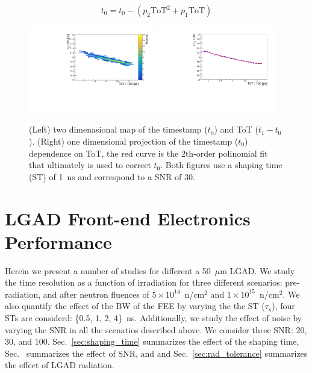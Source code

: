 \documentclass[preprint,1p]{elsarticle}
\begin{document}
\begin{equation}\label{eq:time_walk}
  t_{0} = t_{0}-(p_{2}\mathrm{ToT}^2+p_{1}\mathrm{ToT})
\end{equation}

\begin{figure}[htbp]
  \centering
  \includegraphics[width=0.48\textwidth]{figs/twoD_ToT_pre_rad_st_1ns_snr_30_le_tot_threshold_30mV_v2.pdf} \hfill
  \includegraphics[width=0.48\textwidth]{figs/oneD_ToT_pre_rad_st_1ns_snr_30_le_tot_threshold_30mV_v2.pdf}
  \caption{(Left) two dimenasional map of the timestamp ($t_{0}$) and ToT ($t_{1} - t_{0}$).
  (Right) one dimensional projection of the timestamp ($t_{0}$) dependence on ToT, the red curve is the 2th-order polinomial fit that
  ultimately is used to correct $t_{0}$. Both figures use a shaping time (ST) of 1~\si{ns} and correspond to a SNR of 30.}
  \label{fig:ToT}
\end{figure}




\section{LGAD Front-end Electronics Performance}\label{sec:results}

Herein we present a number of studies for different a 50~$\mu$m LGAD. We study the time resolution as a function of irradiation
for three different scenarios: pre-radiation, and after neutron fluences of
 $5\times 10^{14}$~n/cm$^2$ and $1\times 10^{15}$~n/cm$^2$. We also quantify the effect of the BW of the FEE by varying the
 the ST ($\tau_{s}$), four STs are considerd: \{0.5, 1, 2, 4\}~\si{ns}. Additionally, we study the effect of noise by varying
 the SNR in all the scenatios described above. We consider three SNR: 20, 30, and 100.
 Sec.~\ref{sec:shaping_time} summarizes the effect of the shaping time, Sec.~\label{sec:snr} summarizes the effect of SNR, and
and Sec.~\ref{sec:rad_tolerance} summarizes the effect of LGAD radiation.
\end{document}
